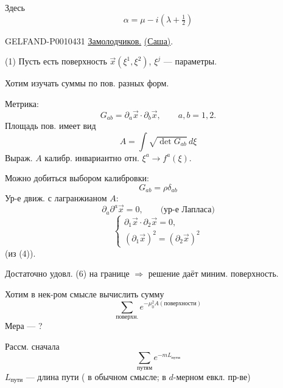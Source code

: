 Здесь
\begin{equation*}
\alpha=\mu-i(\lambda+\tfrac12)
\tag{16}
\end{equation*}


\begin{GelfandAdjacentEvidence}{GELFAND-P001043}{1}
\underline{Замолодчиков.} \underline{(Саша)}.

(1) Пусть есть поверхность $\vec{x}(\xi^1,\xi^2)$, $\xi^j$ — параметры.

Хотим изучать суммы по пов. разных форм.

Метрика:
\begin{equation*}
G_{ab}=\partial_a\vec{x}\cdot\partial_b\vec{x},\qquad a,b=1,2.
\tag{2}
\end{equation*}
Площадь пов. имеет вид
\begin{equation*}
A=\int\sqrt{\det G_{ab}}\,d\xi
\tag{3}
\end{equation*}
Выраж. \(A\) калибр. инвариантно отн. $\xi^a\to f^a(\xi)$.

Можно добиться выбором калибровки:
\begin{equation*}
G_{ab}=\rho\delta_{ab}
\tag{4}
\end{equation*}
Ур-е движ. с лагранжианом $A$:
\begin{equation*}
\partial_a\partial^a\vec{x}=0,\qquad\text{(ур-е Лапласа)}
\tag{5}
\end{equation*}
\begin{equation*}
\begin{cases}
\partial_1\vec{x}\cdot\partial_2\vec{x}=0,\\
(\partial_1\vec{x})^2=(\partial_2\vec{x})^2
\end{cases}
\tag{6}
\end{equation*}
(из (4)).

Достаточно удовл. (6) на границе $\Rightarrow$ решение даёт миним. поверхность.
\end{GelfandAdjacentEvidence}


Хотим в нек-ром смысле вычислить сумму
\begin{equation*}
\sum_{\text{поверхн.}}e^{-\mu_0^2 A(\text{поверхности})}
\tag{7}
\end{equation*}
Мера — ?

Рассм. сначала
\begin{equation*}
\sum_{\text{путям}}e^{-mL_{\text{пути}}}
\tag{8}
\end{equation*}
$L_{\text{пути}}$ — длина пути ( в обычном смысле; в $d$-мерном евкл. пр-ве)

